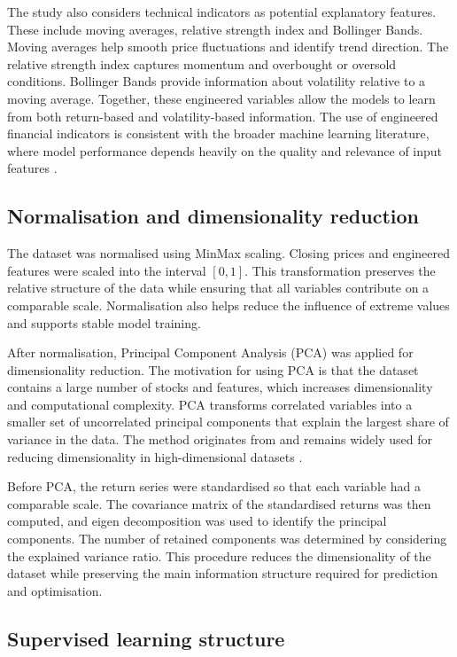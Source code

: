 The study also considers technical indicators as potential explanatory features. These include moving averages, relative strength index and Bollinger Bands. Moving averages help smooth price fluctuations and identify trend direction. The relative strength index captures momentum and overbought or oversold conditions. Bollinger Bands provide information about volatility relative to a moving average. Together, these engineered variables allow the models to learn from both return-based and volatility-based information. The use of engineered financial indicators is consistent with the broader machine learning literature, where model performance depends heavily on the quality and relevance of input features \citep{witten2016data}.

\subsection{Normalisation and dimensionality reduction}

The dataset was normalised using MinMax scaling. Closing prices and engineered features were scaled into the interval $[0,1]$. This transformation preserves the relative structure of the data while ensuring that all variables contribute on a comparable scale. Normalisation also helps reduce the influence of extreme values and supports stable model training.

After normalisation, Principal Component Analysis (PCA) was applied for dimensionality reduction. The motivation for using PCA is that the dataset contains a large number of stocks and features, which increases dimensionality and computational complexity. PCA transforms correlated variables into a smaller set of uncorrelated principal components that explain the largest share of variance in the data. The method originates from \citet{pearson1901lines} and remains widely used for reducing dimensionality in high-dimensional datasets \citep{jolliffe2016principal}.

Before PCA, the return series were standardised so that each variable had a comparable scale. The covariance matrix of the standardised returns was then computed, and eigen decomposition was used to identify the principal components. The number of retained components was determined by considering the explained variance ratio. This procedure reduces the dimensionality of the dataset while preserving the main information structure required for prediction and optimisation.

\subsection{Supervised learning structure}

